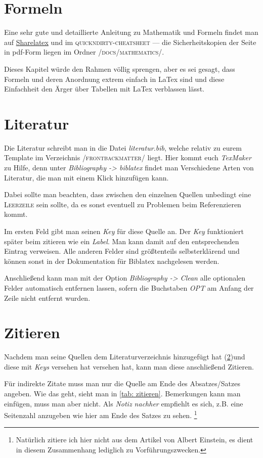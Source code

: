 \section{Formeln}%
Eine sehr gute und detaillierte Anleitung zu Mathematik und Formeln findet man auf \href{https://www.sharelatex.com/learn/Mathematical_expressions}{Sharelatex} und im \textsc{quickndirty-cheatsheet} --- die Sicherheitskopien der Seite in pdf-Form liegen im Ordner \textsc{/docs/mathematics/}.%

Dieses Kapitel würde den Rahmen völlig sprengen, aber es sei gesagt, dass Formeln und deren Anordnung extrem einfach in LaTex sind und diese Einfachheit den Ärger über Tabellen mit LaTex verblassen lässt.
\section{Literatur}%
\label{sec: literatur}%
Die Literatur schreibt man in die Datei \emph{literatur.bib}, welche relativ zu eurem Template im Verzeichnis \textsc{/frontbackmatter/} liegt. Hier kommt euch \emph{TexMaker} zu Hilfe, denn unter \emph{Bibliography -> biblatex} findet man Verschiedene Arten von Literatur, die man mit einem Klick hinzufügen kann.%

Dabei sollte man beachten, dass zwischen den einzelnen Quellen unbedingt eine \textsc{Leerzeile} sein sollte, da es sonst eventuell zu Problemen beim Referenzieren kommt.%

Im ersten Feld gibt man seinen \emph{Key} für diese Quelle an. Der \emph{Key} funktioniert später beim zitieren wie ein \emph{Label}. Man kann damit auf den entsprechenden Eintrag verweisen. Alle anderen Felder sind größtenteils selbsterklärend und können sonst in der Dokumentation für Biblatex nachgelesen werden.%

Anschließend kann man mit der Option \emph{Bibliography -> Clean} alle optionalen Felder automatisch entfernen lassen, sofern die Buchstaben \emph{OPT} am Anfang der Zeile nicht entfernt wurden.%
%
\section{Zitieren}%
\label{sec: zitieren}
Nachdem man seine Quellen dem Literaturverzeichnis hinzugefügt hat (\ref{sec: literatur})und diese mit \emph{Keys} versehen hat versehen hat, kann man diese anschließend Zitieren.%

Für indirekte Zitate muss man nur die Quelle am Ende des Absatzes/Satzes angeben. Wie das geht, sieht man in \ref{tab: zitieren}. Bemerkungen kann man einfügen, muss man aber nicht. Als \emph{Notiz nachher} empfiehlt es sich, z.B. eine Seitenzahl anzugeben wie hier am Ende des Satzes zu sehen. \cite[][S.22 ff]{einstein}\footnote{Natürlich zitiere ich hier nicht aus dem Artikel von Albert Einstein, es dient in diesem Zusammenhang lediglich zu Vorführungszwecken.}%

